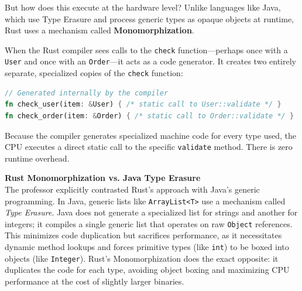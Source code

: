 But how does this execute at the hardware level? Unlike languages like Java, which use Type Erasure and process generic types as opaque objects at runtime, Rust uses a mechanism called \textbf{Monomorphization}.

When the Rust compiler sees calls to the \texttt{check} function---perhaps once with a \texttt{User} and once with an \texttt{Order}---it acts as a code generator. It creates two entirely separate, specialized copies of the \texttt{check} function:

\begin{lstlisting}[language=Rust]
// Generated internally by the compiler
fn check_user(item: &User) { /* static call to User::validate */ }
fn check_order(item: &Order) { /* static call to Order::validate */ }
\end{lstlisting}

Because the compiler generates specialized machine code for every type used, the CPU executes a direct static call to the specific \texttt{validate} method. There is zero runtime overhead. 

\begin{insightbox}
\textbf{Rust Monomorphization vs. Java Type Erasure} \\
The professor explicitly contrasted Rust's approach with Java's generic programming. In Java, generic lists like \texttt{ArrayList<T>} use a mechanism called \textit{Type Erasure}. Java does not generate a specialized list for strings and another for integers; it compiles a single generic list that operates on raw \texttt{Object} references. This minimizes code duplication but sacrifices performance, as it necessitates dynamic method lookups and forces primitive types (like \texttt{int}) to be boxed into objects (like \texttt{Integer}). Rust's Monomorphization does the exact opposite: it duplicates the code for each type, avoiding object boxing and maximizing CPU performance at the cost of slightly larger binaries.
\end{insightbox}

